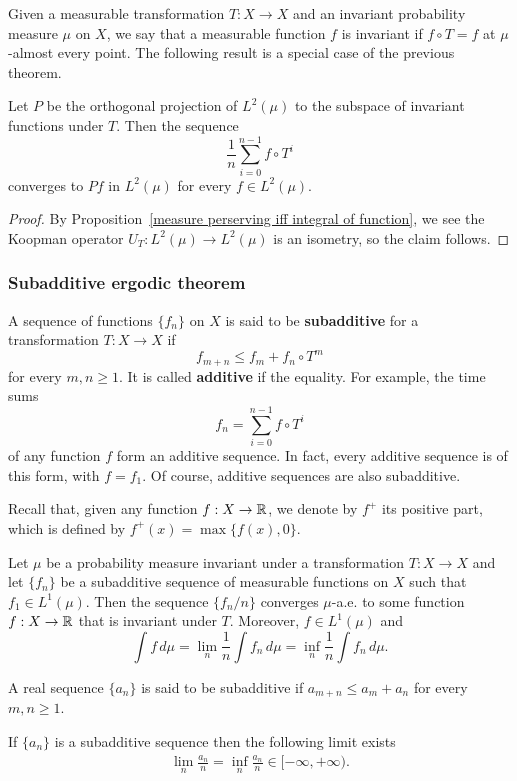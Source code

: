 Given a measurable transformation $T:X\to X$ and an invariant probability measure $\mu$ on $X$, we say that a measurable function $f$ is invariant if $f\circ T=f$ at $\mu$-almost every point. The following result is a special case of the previous theorem.
\begin{theorem}
Let $P$ be the orthogonal projection of $L^2(\mu)$ to the subspace of invariant functions under $T$. Then the sequence
\[\frac{1}{n}\sum_{i=0}^{n-1}f\circ T^i\]
converges to $Pf$ in $L^2(\mu)$ for every $f\in L^2(\mu)$.
\end{theorem}
\begin{proof}
By Proposition~\ref{measure perserving iff integral of function}, we see the Koopman operator $U_T:L^2(\mu)\to L^2(\mu)$ is an isometry, so the claim follows.
\end{proof}
\subsubsection{Subadditive ergodic theorem}
A sequence of functions $\{f_n\}$ on $X$ is said to be \textbf{subadditive} for a transformation $T:X\to X$ if
\[f_{m+n}\leq f_m+f_n\circ T^m\]
for every $m,n\geq 1$. It is called \textbf{additive} if the equality. For example,  the time sums
\[f_n=\sum_{i=0}^{n-1}f\circ T^i\]
of any function $f$ form an additive sequence. In fact, every additive sequence is of this form, with $f=f_1$. Of course, additive sequences are also subadditive.\par
Recall that, given any function $f:X\to\mathbb{R}$, we denote by $f^+$ its positive part, which is defined by $f^+(x)=\max\{f(x),0\}$.
\begin{theorem}\label{subadditive ergodic theorem}
Let $\mu$ be a probability measure invariant under a transformation $T:X\to X$ and let $\{f_n\}$ be a subadditive sequence of measurable functions on $X$ such that $f_1\in L^1(\mu)$. Then the sequence $\{f_n/n\}$ converges $\mu$-a.e. to some function $f:X\to\mathbb{R}$ that is invariant under $T$. Moreover, $f\in L^1(\mu)$ and
\[\int f\,d\mu=\lim_{n}\frac{1}{n}\int f_n\,d\mu=\inf_n\frac{1}{n}\int f_n\,d\mu.\]
\end{theorem}
A real sequence $\{a_n\}$ is said to be subadditive if $a_{m+n}\leq a_m+a_n$ for every $m,n\geq 1$.
\begin{lemma}\label{subadditive sequence limit}
If $\{a_n\}$ is a subadditive sequence then the following limit exists
\begin{align}\label{subadditive sequence limit-1}
\lim_n\frac{a_n}{n}=\inf_n\frac{a_n}{n}\in[-\infty,+\infty).
\end{align}
\end{lemma}
